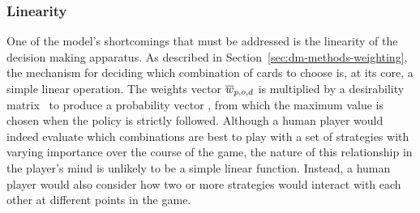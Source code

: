 
\subsubsection*{Linearity}
\label{sec:disc-shortcomings-linearity}


One of the model's shortcomings that must be addressed is the linearity
of the decision making apparatus.
%
As described in Section~\ref{sec:dm-methods-weighting},
the mechanism for deciding which combination of cards to choose is,
at its core,
a simple linear operation.
%
The weights vector $\overline{w}_{p,o,d}$ is multiplied by a desirability matrix \Smat\
to produce a probability vector \pvec,
from which the maximum value is chosen when the policy is strictly followed.
%
Although a human player would indeed evaluate which combinations are best
to play with a set of strategies with varying importance over the course
of the game,
the nature of this relationship in the player's mind is unlikely
to be a simple linear function.
%
Instead,
a human player would also consider how two or more strategies would interact
with each other at different points in the game.

